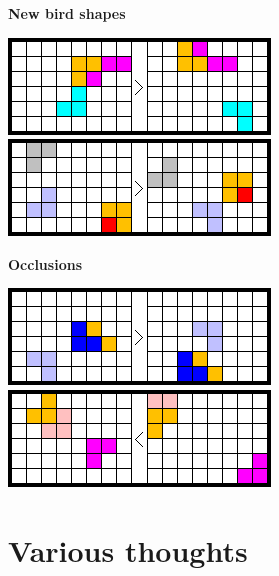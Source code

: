 \documentclass[11pt,a4paper,oneside]{article}
\begin{document}
\textbf{New bird shapes}

\begin{center}

\includegraphics[scale=0.35]{pics/other_shapes_2.png}
\includegraphics[scale=0.35]{pics/other_shapes_3.png}
\end{center}

\textbf{Occlusions}

\begin{center}
\includegraphics[scale=0.35]{pics/other_shapes_1.png}
\includegraphics[scale=0.35]{pics/occlusions_1.png}
\end{center}

\section{Various thoughts}
\end{document}
